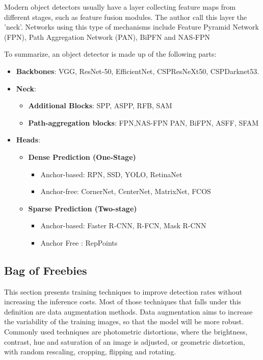 Modern object detectors usually have a layer collecting feature maps from different stages, such as feature fusion modules. The author call this layer the 'neck'. Networks using this type of mechanisms include Feature Pyramid Network (FPN)\cite{fpn}, Path Aggregation Network (PAN)\cite{pan}, BiPFN\cite{bifpn} and NAS-FPN\cite{nasFPN}

To summarize, an object detector is made up of the following parts:

\begin{itemize}
	\item \textbf{Backbones}: VGG\cite{vgg}, ResNet-50\cite{resNet}, EfficientNet\cite{efficientNet}, CSPResNeXt50\cite{resNeXt}, CSPDarknet53\cite{CSPDarknet53}.
	\item \textbf{Neck}:
		\begin{itemize}
			\item \textbf{Additional Blocks}: SPP\cite{spp}, ASPP\cite{aspp}, RFB\cite{RFB}, SAM\cite{sam}
			\item \textbf{Path-aggregation blocks}: FPN\cite{fpn},NAS-FPN\cite{nasFPN} PAN\cite{pan}, BiFPN\cite{bifpn}, ASFF\cite{ASFF}, SFAM\cite{SFAM} 
		\end{itemize}
	\item \textbf{Heads}:
		\begin{itemize}
			\item \textbf{Dense Prediction (One-Stage)}
				\begin{itemize}
					\item Anchor-based: RPN\cite{FasterRCNN}, SSD\cite{ssd}, YOLO\cite{yolov3}, RetinaNet\cite{retinaNet}
					\item Anchor-free: CornerNet\cite{cornerNet}, CenterNet\cite{centerNet}, MatrixNet\cite{matrixNet}, FCOS\cite{fcos}
				\end{itemize}
			\item \textbf{Sparse Prediction (Two-stage)}
				\begin{itemize}
					\item Anchor-based: Faster R-CNN\cite{FasterRCNN}, R-FCN\cite{rfcn}, Mask R-CNN\cite{maskrcnn}
					\item Anchor Free : RepPoints\cite{repPoints}
				\end{itemize}
		\end{itemize}

\end{itemize}

\subsection{Bag of Freebies}\label{bof}
This section presents training techniques to improve detection rates without increasing the inference costs. Most of those techniques that falls under this definition are data augmentation methods. Data augmentation aims to increase the variability of the training images, so that the model will be more robust. Commonly used techniques are photometric distortions, where the brightness, contrast, hue and saturation of an image is adjusted, or geometric distortion, with random rescaling, cropping, flipping and rotating.

